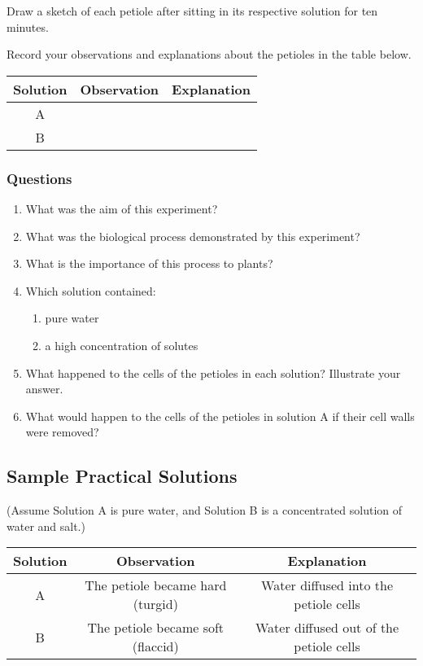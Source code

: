 Draw a sketch of each petiole after sitting in its respective solution for ten minutes.

Record your observations and explanations about the petioles in the table below.

\begin{center}
\begin{tabular}{| c | c | c |}
\hline
Solution & Observation & Explanation \\ \hline
A & & \\ \hline
B & & \\ \hline
\hline
\end{tabular}
\end{center}

\subsubsection{Questions}
\begin{enumerate}
\item{What was the aim of this experiment?}
\item{What was the biological process demonstrated by this experiment?}
\item{What is the importance of this process to plants?}
\item{Which solution contained:}
\begin{enumerate}
\item{pure water}
\item{a high concentration of solutes}
\end{enumerate}
\item{What happened to the cells of the petioles in each solution? Illustrate your answer.}
\item{What would happen to the cells of the petioles in solution A if their cell walls were removed?}
\end{enumerate}

\subsection{Sample Practical Solutions}

(Assume Solution A is pure water, and Solution B is a concentrated solution of water and salt.)

\begin{center}
\begin{tabular}{| c | c | c |}
\hline
Solution & Observation & Explanation \\ \hline
A & The petiole became hard (turgid) & Water diffused into the petiole cells \\ \hline
B & The petiole became soft (flaccid) & Water diffused out of the petiole cells \\ \hline
\hline
\end{tabular}
\end{center}

